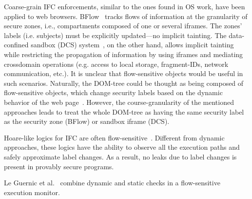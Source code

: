 Coarse-grain IFC enforcements, similar to the ones found in OS work, have been
applied to web browsers. BFlow~\citep{Yip:2009} tracks flows of information at
the granularity of secure zones, i.e., compartments composed of one or several
iframes. The zones' labels (i.e. subjects) must be explicitly updated---no
implicit tainting. The data-confined sandbox (DCS)
system~\citep{conf/esorics/AkhaweLHSS13}, on the other hand, allows implicit
tainting while restricting the propagation of information by using iframes and
mediating crossdomain operations (e.g. access to local storage, fragment-IDs,
network communication, etc.). It is unclear that flow-sensitive objects would be
useful in such scenarios. Naturally, the DOM-tree could be thought as being
composed of flow-sensitive objects, which change security labels based on the
dynamic behavior of the web page~\citep{Russo:2009}. However, the
course-granularity of the mentioned approaches leads to treat the whole DOM-tree
as having the same security label as the security zone (BFlow) or sandbox iframe
(DCS). 

Hoare-like logics for IFC are often
flow-sensitive~\citep[e.g.][]{Amtoft:2006,Nanevski:2011}. Different from dynamic
approaches, these logics have the ability to observe all the execution paths and
safely approximate label changes. As a result, no leaks due to label changes is
present in provably secure programs.


Le Guernic et al.~\citep{LeGuernic:2006,Guernic:2007:ACM} combine dynamic and
static checks in a flow-sensitive execution monitor.
 



